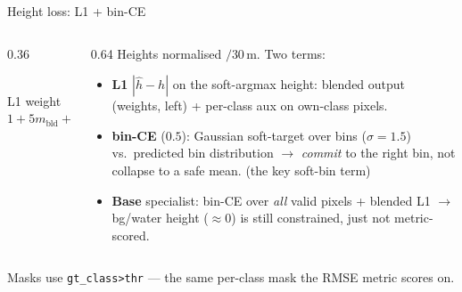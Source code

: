 \documentclass[aspectratio=169,11pt]{beamer}
\newcommand{\code}[1]{\texttt{\small #1}}
\begin{document}
\begin{frame}{Height loss: L1 + bin-CE}
  \begin{columns}[T]
    \begin{column}{0.36\textwidth}
      \centering
      \\[3pt]
      {\scriptsize L1 weight $1+5m_{\text{bld}}+1.5m_{\text{veg}}$}
    \end{column}
    \begin{column}{0.64\textwidth}
      Heights normalised $/30$\,m. Two terms:
      \begin{itemize}\small
        \item \textbf{L1} $|\hat h-h|$ on the soft-argmax height: blended output
          (weights, left) + per-class aux on own-class pixels.
        \item \textbf{bin-CE} ($0.5$): Gaussian soft-target over bins ($\sigma{=}1.5$)
          vs.\ predicted bin distribution $\to$ \emph{commit} to the right bin,
          not collapse to a safe mean. \textcolor{cHead}{(the key soft-bin term)}
        \item \textbf{Base} specialist: bin-CE over \emph{all} valid pixels +
          blended L1 $\to$ bg/water height ($\approx0$) is still constrained,
          just not metric-scored.
      \end{itemize}
    \end{column}
  \end{columns}
  \vspace{0.1em}
  {\footnotesize Masks use \code{gt\_class>thr} --- the same per-class mask the RMSE metric scores on.}
\end{frame}
\end{document}

